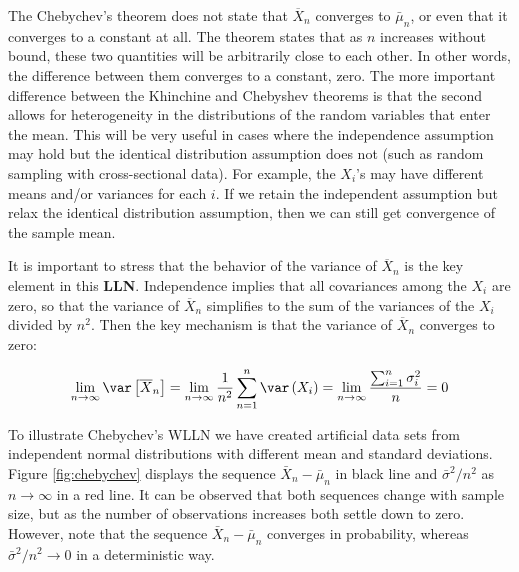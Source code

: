 The Chebychev's theorem does not state that $\overline{X}_n$ converges to $\bar{\mu}_n$, or even that it converges to a constant at all. The theorem states that as $n$ increases without bound, these two quantities will be arbitrarily close to each other. In other words, the difference between them converges to a constant, zero. The more important difference between the Khinchine and Chebyshev theorems is that the second allows for heterogeneity in the distributions of the random variables that enter the mean. This will be very useful in cases where the independence assumption may hold but the identical distribution assumption does not (such as random sampling with cross-sectional data). For example, the $X_i$'s may have different means and/or variances for each $i$. If we retain the independent assumption but relax the identical distribution assumption, then we can still get convergence of the sample mean.

It is important to stress that the behavior of the variance of $\overline{X}_n$ is the key element in this \textbf{LLN}. Independence implies that all covariances among the $X_i$ are zero, so that the variance of $\overline{X}_n$ simplifies to the sum of the variances of the $X_i$ divided by $n^2$. Then the key mechanism is that the variance of $\overline{X}_n$ converges to zero:

\begin{equation*}
 \lim_{n\to\infty}\var\left[ \overline{X}_n\right]=\lim_{n\to\infty}\frac{1}{n^2}\sum_{n=1}^n\var\left(X_i\right)=\lim_{n\to\infty}\frac{\sum_{i = 1}^n\sigma^2_i}{n}=0 
\end{equation*}

To illustrate Chebychev's WLLN we have created artificial data sets from independent normal distributions with different mean and standard deviations. Figure \ref{fig:chebychev} displays the sequence $\bar{X}_n - \bar{\mu}_n$ in black line and $\bar{\sigma}^2 / n^2$ as $n\to \infty$ in a red line. It can be observed that both sequences change with sample size, but as the number of observations increases both settle down to zero.  However, note that the sequence $\bar{X}_n - \bar{\mu}_n$ converges in probability, whereas $\bar{\sigma}^2 / n^2\to 0$ in a deterministic way. 


